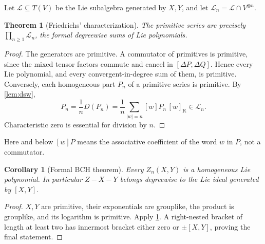 \documentclass[11pt]{article}
\numberwithin{equation}{section}
\newtheorem{theorem}{Theorem}[section]
\newtheorem{corollary}[corollary]{Corollary}
\theoremstyle{definition}
\theoremstyle{remark}
\newcommand{\cL}{\mathcal{L}}
\newcommand{\RB}[1]{[#1]_{\mathrm R}}
\begin{document}
Let $\cL\subseteq T(V)$ be the Lie subalgebra generated by $X,Y$, and let
$\cL_n=\cL\cap V^{\otimes n}$.
\begin{theorem}[Friedrichs' characterization]\label{thm:friedrichs}
The primitive series are precisely $\prod_{n\geq1}\cL_n$, the
formal degreewise sums of Lie polynomials.
\end{theorem}
\begin{proof}
The generators are primitive. A commutator of primitives is primitive,
since the mixed tensor factors commute and cancel in
$[\Delta P,\Delta Q]$. Hence every Lie polynomial, and every
convergent-in-degree sum of them, is primitive.
Conversely, each homogeneous part $P_n$ of a primitive series is
primitive. By \cref{lem:dsw},
\[
 P_n=\frac1nD(P_n)=\frac1n\sum_{|w|=n}[w]P_n\,\RB{w}\in\cL_n.
\]
Characteristic zero is essential for division by $n$.
\end{proof}
Here and below $[w]P$ means the associative coefficient of the word $w$
in $P$, not a commutator.

\begin{corollary}[Formal BCH theorem]\label{cor:formalBCH}
Every $Z_n(X,Y)$ is a homogeneous Lie polynomial. In particular
$Z-X-Y$ belongs degreewise to the Lie ideal generated by $[X,Y]$.
\end{corollary}
\begin{proof}
$X,Y$ are primitive, their exponentials are grouplike, the product is
grouplike, and its logarithm is primitive. Apply
\cref{thm:friedrichs}. A right-nested bracket of length at least two has
innermost bracket either zero or $\pm[X,Y]$, proving the final statement.
\end{proof}
\end{document}
